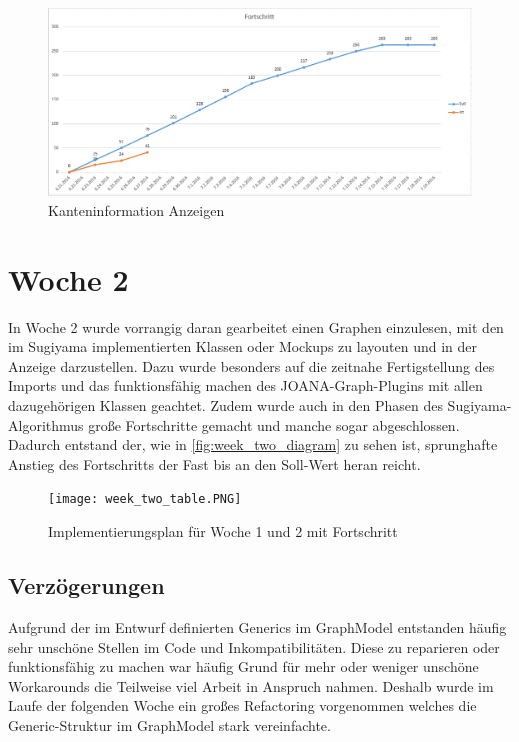 \begin{figure}[!htbp]
	\centering
	\includegraphics[width=380pt]{resourcen/week_one_diagram.PNG}
	\caption{Kanteninformation Anzeigen}
	\label{fig:week_one_diagram}
\end{figure}
\newpage

\section{Woche 2}
In Woche 2 wurde vorrangig daran gearbeitet einen Graphen einzulesen, mit den im Sugiyama implementierten Klassen oder Mockups zu layouten und in der Anzeige darzustellen. Dazu wurde besonders auf die zeitnahe Fertigstellung des Imports und das funktionsfähig machen des JOANA-Graph-Plugins mit allen dazugehörigen Klassen geachtet. Zudem wurde auch in den Phasen des Sugiyama-Algorithmus große Fortschritte gemacht und manche sogar abgeschlossen. Dadurch entstand der, wie in \ref{fig:week_two_diagram} zu sehen ist, sprunghafte Anstieg des Fortschritts der Fast bis an den Soll-Wert heran reicht. 
\begin{figure}[!htbp]
	\centering
	\texttt{[image: week\_two\_table.PNG]}
	\caption{Implementierungsplan für Woche 1 und 2 mit Fortschritt}
	\label{fig:week_two_table}
\end{figure}
\subsection{Verzögerungen}
Aufgrund der im Entwurf definierten Generics im GraphModel entstanden häufig sehr unschöne Stellen im Code und Inkompatibilitäten. Diese zu reparieren oder funktionsfähig zu machen war häufig Grund für mehr oder weniger unschöne Workarounds die Teilweise viel Arbeit in Anspruch nahmen. Deshalb wurde im Laufe der folgenden Woche ein großes Refactoring vorgenommen welches die Generic-Struktur im GraphModel stark vereinfachte.

